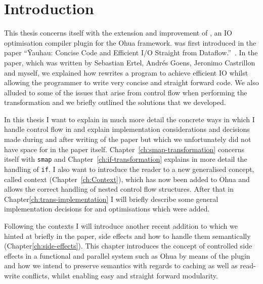 \chapter{Introduction}

\label{ch:Intro}



This thesis concerns itself with the extension and improvement of \yauhau{}, an IO optimisation compiler plugin for the Ohua framework.
\yauhau{} was first introduced in the paper ``Ÿauhau: Concise Code and Efficient I/O Straight from Dataflow.''~\cite{ErtelGoensAdamEtAl2016}.
In the paper, which was written by Sebastian Ertel, Andrés Goens, Jeronimo Castrillon and myself, we explained how \yauhau{} rewrites a program to achieve efficient IO whilst allowing the programmer to write very concise and straight forward code.
We also alluded to some of the issues that arise from control flow when performing the \yauhau{} transformation and we briefly outlined the solutions that we developed.

In this thesis I want to explain in much more detail the concrete ways in which I handle control flow in \yauhau{} and explain implementation considerations and decisions made during and after writing of the paper but which we unfortunately did not have space for in the paper itself.
Chapter~\ref{ch:smap-transformation} concerns itself with \texttt{smap} and Chapter~\ref{ch:if-transformation} explains in more detail the handling of \texttt{if}.
I also want to introduce the reader to a new generalised concept, called context (Chapter~\ref{ch:Context}), which has now been added to Ohua and allows the correct handling of nested control flow structures.
After that in Chapter\ref{ch:trans-implementation} I will briefly describe some general implementation decisions for \yauhau{} and optimisations which were added.

Following the contexts I will introduce another recent addition to \yauhau{} which we hinted at briefly in the paper, side effects and how to handle them semantically (Chapter\ref{ch:side-effects}).
This chapter introduces the concept of controlled side effects in a functional and parallel system such as Ohua by means of the \yauhau{} plugin and how we intend to preserve semantics with regards to caching as well as read-write conflicts, whilst enabling easy and straight forward modularity.

